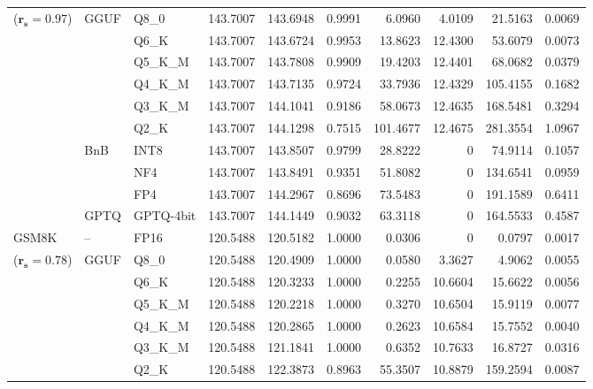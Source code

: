 \begin{table}[t]
{\begin{tabular}{ll l rrrrrrr}
{\small ($\mathbf{r_s{=}0.97}$)} & GGUF & Q8\_0 & 143.7007 & 143.6948 & 0.9991 & 6.0960 & 4.0109 & 21.5163 & 0.0069 \\
 &  & Q6\_K & 143.7007 & 143.6724 & 0.9953 & 13.8623 & 12.4300 & 53.6079 & 0.0073 \\
 &  & Q5\_K\_M & 143.7007 & 143.7808 & 0.9909 & 19.4203 & 12.4401 & 68.0682 & 0.0379 \\
 &  & Q4\_K\_M & 143.7007 & 143.7135 & 0.9724 & 33.7936 & 12.4329 & 105.4155 & 0.1682 \\
 &  & Q3\_K\_M & 143.7007 & 144.1041 & \cellcolor{red!18} 0.9186 & \cellcolor{red!18} 58.0673 & 12.4635 & \cellcolor{red!18} 168.5481 & \cellcolor{red!18} 0.3294 \\
 &  & Q2\_K & 143.7007 & 144.1298 & \cellcolor{red!35} 0.7515 & \cellcolor{red!35} 101.4677 & 12.4675 & \cellcolor{red!35} 281.3554 & \cellcolor{red!35} 1.0967 \\
 & BnB & INT8 & 143.7007 & 143.8507 & 0.9799 & 28.8222 & \cellcolor{cyan!12} $0$ & 74.9114 & 0.1057 \\
 &  & NF4 & 143.7007 & 143.8491 & \cellcolor{red!18} 0.9351 & \cellcolor{red!18} 51.8082 & \cellcolor{cyan!12} $0$ & \cellcolor{red!18} 134.6541 & \cellcolor{red!18} 0.0959 \\
 &  & FP4 & 143.7007 & 144.2967 & \cellcolor{red!18} 0.8696 & \cellcolor{red!18} 73.5483 & \cellcolor{cyan!12} $0$ & \cellcolor{red!18} 191.1589 & \cellcolor{red!18} 0.6411 \\
 & GPTQ & GPTQ-4bit & 143.7007 & 144.1449 & \cellcolor{red!18} 0.9032 & \cellcolor{red!18} 63.3118 & \cellcolor{cyan!12} $0$ & \cellcolor{red!18} 164.5533 & \cellcolor{red!18} 0.4587 \\
\midrule
GSM8K & -- & FP16 & 120.5488 & 120.5182 & 1.0000 & 0.0306 & \cellcolor{cyan!12} $0$ & 0.0797 & 0.0017 \\
{\small ($\mathbf{r_s{=}0.78}$)} & GGUF & Q8\_0 & 120.5488 & 120.4909 & 1.0000 & 0.0580 & 3.3627 & 4.9062 & 0.0055 \\
 &  & Q6\_K & 120.5488 & 120.3233 & 1.0000 & 0.2255 & 10.6604 & 15.6622 & 0.0056 \\
 &  & Q5\_K\_M & 120.5488 & 120.2218 & 1.0000 & 0.3270 & 10.6504 & 15.9119 & 0.0077 \\
 &  & Q4\_K\_M & 120.5488 & 120.2865 & 1.0000 & 0.2623 & 10.6584 & 15.7552 & 0.0040 \\
 &  & Q3\_K\_M & 120.5488 & 121.1841 & 1.0000 & 0.6352 & 10.7633 & 16.8727 & 0.0316 \\
 &  & Q2\_K & 120.5488 & 122.3873 & \cellcolor{red!18} 0.8963 & \cellcolor{red!18} 55.3507 & 10.8879 & \cellcolor{red!18} 159.2594 & \cellcolor{red!18} 0.0087 \\

\end{tabular}}
\end{table}
